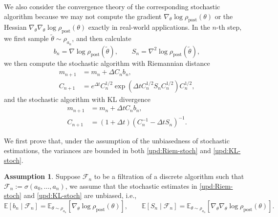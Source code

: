 \documentclass[11pt]{article}
\theoremstyle{plain}
\theoremstyle{definition}
\newtheorem{assumption}[theorem]{Assumption}
\theoremstyle{remark}
\newcommand{\post}{\mathrm{post}}
\begin{document}
We also consider the convergence theory of the corresponding stochastic algorithm because we may not compute the gradient $\nabla_\theta \log \rho_\post (\theta)$ or the Hessian $\nabla_\theta \nabla_\theta \log \rho_\post (\theta)$ exactly in real-world applications. In the $n$-th step, we first sample $\tilde \theta \sim \rho_{a_n}$, and then calculate 
\begin{equation*}
    b_n = \nabla \log \rho_\mathrm{post} (\tilde\theta), \qquad S_n = \nabla^2 \log \rho_\mathrm{post}(\tilde\theta),
\end{equation*}
we then compute the stochastic algorithm with Riemannian distance
\begin{equation}\label{upd:Riem-stoch}
    \begin{aligned}
        m_{n+1} &= m_n + \Delta C_n b_n, \\
        C_{n+1} &= e^{\Delta t} C_n^{1/2} \exp ( \Delta t C_n^{1/2} S_n C_n^{1/2}) C_n^{1/2},
    \end{aligned}
\end{equation}
and the stochastic algorithm with KL divergence
\begin{equation}\label{upd:KL-stoch}
    \begin{aligned}
        m_{n+1} &= m_n + \Delta t C_n b_n, \\
        C_{n+1} &= (1 + \Delta t) (C_n^{-1} - \Delta t S_n)^{-1}.
    \end{aligned}
\end{equation}

We first prove that, under the assumption of the unbiasedness of stochastic estimations, the variances are bounded in both \eqref{upd:Riem-stoch} and \eqref{upd:KL-stoch}.

\begin{assumption}\label{assump:unbiased}
    Suppose $\mathcal{F}_n$ to be a filtration of a discrete algorithm such that $\mathcal{F}_n := \sigma (a_0, \ldots, a_n)$, we assume that the stochastic estimates in \eqref{upd:Riem-stoch} and \eqref{upd:KL-stoch} are unbiased, i.e., 
    \begin{equation*}
        \mathbb{E}[b_n \mid \mathcal{F}_n] = \mathbb{E}_{\theta \sim \rho_{a_n}} [\nabla_\theta \log \rho_\mathrm{post} (\theta)], \qquad \mathbb{E}[S_n \mid \mathcal{F}_n] = \mathbb{E}_{\theta \sim \rho_{a_n}} [\nabla_\theta \nabla_\theta \log \rho_\mathrm{post} (\theta)].
    \end{equation*}
\end{assumption}
\end{document}

